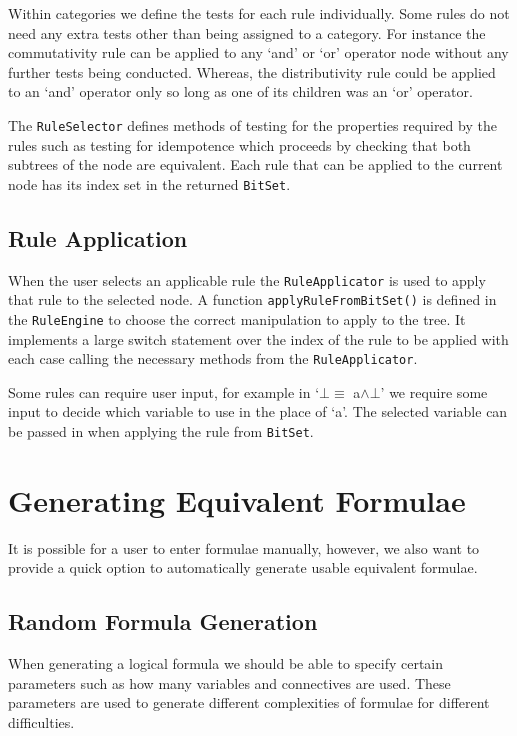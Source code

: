 \documentclass{report}
\begin{document}
Within categories we define the tests for each rule individually. Some rules do not need any extra tests other than being assigned to a category. For instance the commutativity rule can be applied to any `and' or `or' operator node without any further tests being conducted. Whereas, the distributivity rule could be applied to an `and' operator only so long as one of its children was an `or' operator.

The {\tt RuleSelector} defines methods of testing for the properties required by the rules such as testing for idempotence which proceeds by checking that both subtrees of the node are equivalent. Each rule that can be applied to the current node has its index set in the returned {\tt BitSet}.

\subsection{Rule Application}
\label{sub:rule_application}

When the user selects an applicable rule the {\tt RuleApplicator} is used to apply that rule to the selected node. A function {\tt applyRuleFromBitSet()} is defined in the {\tt RuleEngine} to choose the correct manipulation to apply to the tree. It implements a large switch statement over the index of the rule to be applied with each case calling the necessary methods from the {\tt RuleApplicator}.

Some rules can require user input, for example in `$\bot \equiv$ a$\land\bot$' we require some input to decide which variable to use in the place of `a'. The selected variable can be passed in when applying the rule from {\tt BitSet}.

\section{Generating Equivalent Formulae}

It is possible for a user to enter formulae manually, however, we also want to provide a quick option to automatically generate usable equivalent formulae.

\subsection{Random Formula Generation}

When generating a logical formula we should be able to specify certain parameters such as how many variables and connectives are used. These parameters are used to generate different complexities of formulae for different difficulties.
\end{document}
